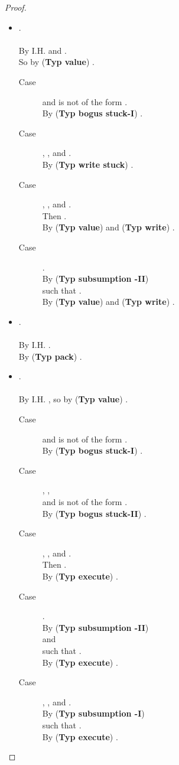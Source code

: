 \documentclass{sigplanconf}
\newcommand{\trule}[1]{(\textbf{Typ #1})}
\begin{document}
\begin{proof}
\begin{itemize}
\item .\\
\\
By I.H.  and .\\
So by \trule{value} .
\begin{description}
\item[Case]  and  is not of the form .\\
By \trule{bogus stuck-I} .
\item[Case] , , and .\\
By \trule{write stuck} .
\item[Case] , , and .\\
Then .\\
By \trule{value} and \trule{write} .
\item[Case] .\\
By \trule{subsumption -II} \\
  such that .\\
By \trule{value} and \trule{write} .
\end{description}

\item .\\
\\
By I.H. .\\
By \trule{pack} .\\
\item .\\
\\
By I.H. , so by \trule{value} .
\begin{description}
\item[Case]  and  is not of the form .\\
By \trule{bogus stuck-I} .
\item[Case] , , \\
 and  is not of the form .\\
By \trule{bogus stuck-II} .
\item[Case] , , and .\\
Then .\\
By \trule{execute} .
\item[Case] .\\
By \trule{subsumption -II} \\
  and \\
 such that .\\
By \trule{execute} .
\item[Case] , , and .\\
By \trule{subsumption -I}\\
  such that .\\
By \trule{execute} .
\end{description}


\end{itemize}
\end{proof}
\end{document}
